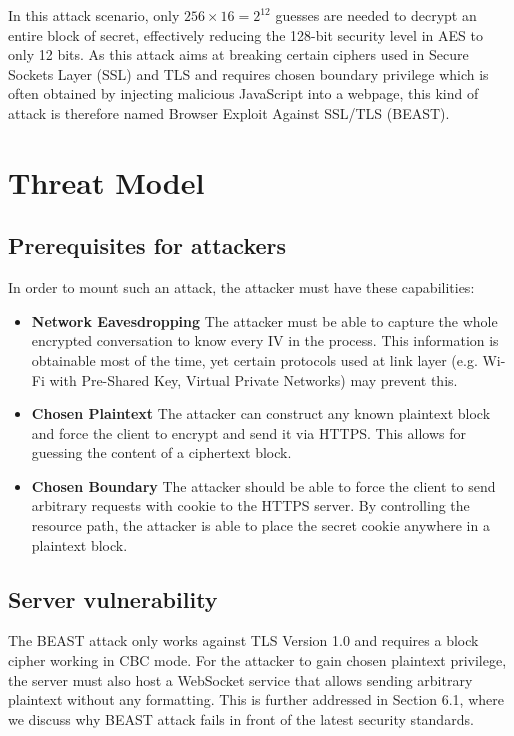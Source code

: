 \documentclass{acm_proc_article-sp}
\begin{document}
In this attack scenario, only $256\times16 = 2^{12}$ guesses are needed to decrypt an entire block 
of secret, effectively reducing the 128-bit security level in AES to only 12 bits. As this attack aims at
breaking certain ciphers used in Secure Sockets Layer (SSL) and TLS and requires chosen
boundary privilege which is often obtained by injecting malicious JavaScript into a webpage,
this kind of attack is therefore named Browser Exploit Against SSL/TLS (BEAST).

\section{Threat Model}
\subsection{Prerequisites for attackers}
In order to mount such an attack, the attacker must have these capabilities:
\begin{itemize}
    \item \textbf{Network Eavesdropping} The attacker must be able to capture the whole 
    encrypted conversation to know every IV in the process. This information is obtainable most
    of the time, yet certain protocols used at link layer (e.g. Wi-Fi with Pre-Shared Key, Virtual Private
    Networks) may prevent this.
    \item \textbf{Chosen Plaintext} The attacker can construct any known plaintext block and force the
    client to encrypt and send it via HTTPS. This allows for guessing the content of a ciphertext block.
    \item \textbf{Chosen Boundary} The attacker should be able to force the client to send arbitrary
    requests with cookie to the HTTPS server. By controlling the resource path, the attacker is able to
    place the secret cookie anywhere in a plaintext block.
\end{itemize}
\subsection{Server vulnerability}
The BEAST attack only works against TLS Version 1.0 and requires a block cipher working in CBC
mode. For the attacker to gain chosen plaintext privilege, the server must also host a WebSocket
service that allows sending arbitrary plaintext without any formatting. This is further addressed in
Section 6.1, where we discuss why BEAST attack fails in front of the latest security standards.
\end{document}
